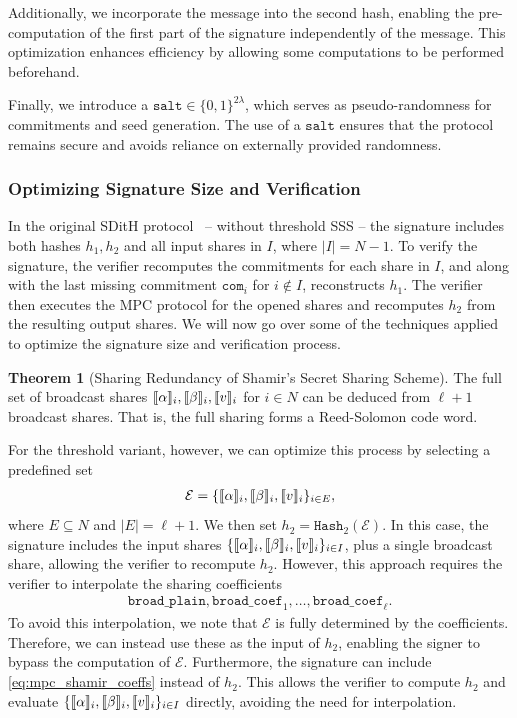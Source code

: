 \documentclass[11pt]{report}
\theoremstyle{definition}
\newtheorem{theorem}{Theorem}[section]
\theoremstyle{plain}
\begin{document}
Additionally, we incorporate the message into the second hash, enabling the pre-computation of the first part of the signature independently of the message. This optimization enhances efficiency by allowing some computations to be performed beforehand.

Finally, we introduce a $\texttt{salt} \in \{0,1\}^{2\lambda}$, which serves as pseudo-randomness for commitments and seed generation. The use of a $\texttt{salt}$ ensures that the protocol remains secure and avoids reliance on externally provided randomness.

\subsubsection{Optimizing Signature Size and Verification}\label{sec:mpc_thresh_tweak}
In the original SDitH protocol~\cite[Figure 1]{aguilarsyndrome11} -- without threshold SSS -- the signature includes both hashes $h_1, h_2$ and all input shares in $I$, where $|I| = N - 1$.
To verify the signature, the verifier recomputes the commitments for each share in $I$, and along with the last missing commitment $\texttt{com}_i$ for $i \notin I$, reconstructs $h_1$. The verifier then executes the MPC protocol for the opened shares and recomputes $h_2$ from the resulting output shares. We will now go over some of the techniques applied to optimize the signature size and verification process.

\begin{theorem}[Sharing Redundancy of Shamir's Secret Sharing Scheme]
  The full set of broadcast shares $\llbracket \alpha \rrbracket_i, \llbracket \beta \rrbracket_i, \llbracket v \rrbracket_i$ for $i \in N$ can be deduced from $\ell + 1$ broadcast shares. That is, the full sharing forms a Reed-Solomon code word.
\end{theorem}

\noindent
For the threshold variant, however, we can optimize this process by selecting a predefined set
\begin{align*}
  \mathcal{E} = \{\llbracket \alpha \rrbracket_i, \llbracket \beta \rrbracket_i, \llbracket v \rrbracket_i\}_{i \in E},
\end{align*}
where $E \subseteq N$ and $|E| = \ell + 1$. We then set $h_2 = \texttt{Hash}_2(\mathcal{E})$. In this case, the signature includes the input shares $\{\llbracket \alpha \rrbracket_i, \llbracket \beta \rrbracket_i, \llbracket v \rrbracket_i\}_{i \in I}$, plus a single broadcast share, allowing the verifier to recompute $h_2$. However, this approach requires the verifier to interpolate the sharing coefficients
\begin{align}
  \texttt{broad\_plain}, \texttt{broad\_coef}_1, \dots, \texttt{broad\_coef}_\ell.\label{eq:mpc_shamir_coeffs}
\end{align}
To avoid this interpolation, we note that $\mathcal{E}$ is fully determined by the coefficients. Therefore, we can instead use these as the input of $h_2$, enabling the signer to bypass the computation of $\mathcal{E}$. Furthermore, the signature can include \autoref{eq:mpc_shamir_coeffs} instead of $h_2$. This allows the verifier to compute $h_2$ and evaluate $\{\llbracket \alpha \rrbracket_i, \llbracket \beta \rrbracket_i, \llbracket v \rrbracket_i\}_{i \in I}$ directly, avoiding the need for interpolation.
\end{document}
